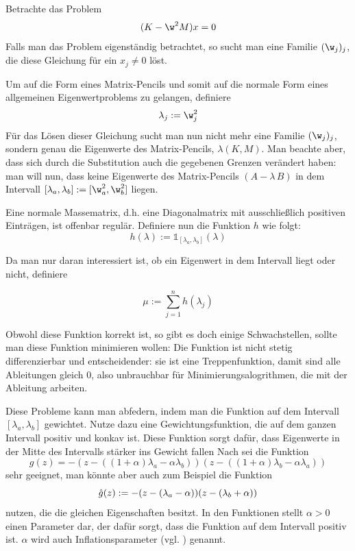 \documentclass[a4paper,12pt]{report}
\newcommand{\zitat}[1]{\glqq #1\grqq}
\newcommand{\AlamB}{A-\lambda\,B}
\newcommand{\1}{\mathds{1}}
\theoremstyle{plain} %
\theoremstyle{definition} %
\theoremstyle{remark}
\begin{document}
            Betrachte das Problem
            $$(K-\w^2 M)x = 0$$
            Falls man das Problem eigenständig betrachtet, so sucht man eine Familie $(\w_j)_j$, die diese Gleichung für ein $x_j \ne 0$ löst.

            Um auf die Form eines Matrix-Pencils und somit auf die normale Form eines allgemeinen Eigenwertproblems zu gelangen, definiere
            $$\lambda_j := \w_j^2$$
            Für das Lösen dieser Gleichung sucht man nun nicht mehr eine Familie $(\w_j)_j$, sondern genau die Eigenwerte des Matrix-Pencils, $\lambda(K,M)$.
            Man beachte aber, dass sich durch die Substitution auch die gegebenen Grenzen verändert haben:
            man will nun, dass keine Eigenwerte des Matrix-Pencils $(\AlamB)$ in dem Intervall $[\lambda_a, \lambda_b]:=[\w_a^2,\w^2_b]$ liegen.

            Eine normale Massematrix, d.h. eine Diagonalmatrix mit ausschließlich positiven Einträgen, ist offenbar regulär.
            Definiere nun die Funktion $h$ wie folgt:
            $$h(\lambda):=\1_{[\lambda_a,\lambda_b]}(\lambda)$$

            Da man nur daran interessiert ist, ob ein Eigenwert in dem Intervall liegt oder nicht, definiere

            $$\mu := \sum_{j=1}^{n} h(\lambda_j)$$

            Obwohl diese Funktion korrekt ist, so gibt es doch einige Schwachstellen, sollte man diese Funktion minimieren wollen:
            Die Funktion ist nicht stetig differenzierbar und entscheidender: sie ist eine Treppenfunktion, damit sind alle Ableitungen gleich 0, also unbrauchbar für Minimierungsalogrithmen, die mit der Ableitung arbeiten.

            Diese Probleme kann man abfedern, indem man die Funktion auf dem Intervall $[\lambda_a, \lambda_b]$ gewichtet.
            Nutze dazu eine Gewichtungsfunktion, die auf dem ganzen Intervall positiv und konkav ist.
            Diese Funktion sorgt dafür, dass Eigenwerte in der Mitte des Intervalls stärker ins Gewicht fallen
            Nach \cite[S. 3]{hauptteilTkachuk} sei die Funktion
            $$g(z) = -(z-((1+\alpha)\lambda_a -\alpha\lambda_b))(z-((1+\alpha)\lambda_b-\alpha\lambda_a))$$
            sehr geeignet, man könnte aber auch zum Beispiel die Funktion
            $$\Hat g(z) := -(z-(\lambda_a-\alpha))(z-(\lambda_b+\alpha))$$
            nutzen, die die gleichen Eigenschaften besitzt.
            In den Funktionen stellt $\alpha>0$ einen Parameter dar, der dafür sorgt, dass die Funktion auf dem Intervall positiv ist.
            $\alpha$ wird auch \zitat{Inflationsparameter} (vgl. \cite[S. 3]{hauptteilTkachuk}) genannt.
\end{document}
